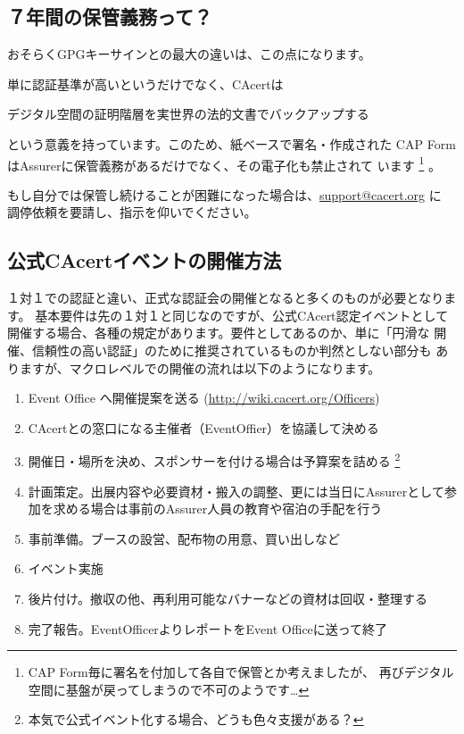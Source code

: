 \documentclass[mingoth,a4paper]{jsarticle}
\begin{document}
\subsection{７年間の保管義務って？}
おそらくGPGキーサインとの最大の違いは、この点になります。

単に認証基準が高いというだけでなく、CAcertは
\begin{center}
\Large{デジタル空間の証明階層を実世界の法的文書でバックアップする}
\end{center}
という意義を持っています。このため、紙ベースで署名・作成された
CAP FormはAssurerに保管義務があるだけでなく、その電子化も禁止されて
います
\footnote{CAP Form毎に署名を付加して各自で保管とか考えましたが、
再びデジタル空間に基盤が戻ってしまうので不可のようです…}
。

もし自分では保管し続けることが困難になった場合は、\url{support@cacert.org} に
調停依頼を要請し、指示を仰いでください。

\subsection{公式CAcertイベントの開催方法}
１対１での認証と違い、正式な認証会の開催となると多くのものが必要となります。
基本要件は先の１対１と同じなのですが、公式CAcert認定イベントとして
開催する場合、各種の規定があります。要件としてあるのか、単に「円滑な
開催、信頼性の高い認証」のために推奨されているものか判然としない部分も
ありますが、マクロレベルでの開催の流れは以下のようになります。

\begin{enumerate}
\item Event Office へ開催提案を送る (\url{http://wiki.cacert.org/Officers})
\item CAcertとの窓口になる主催者（EventOffier）を協議して決める
\item 開催日・場所を決め、スポンサーを付ける場合は予算案を詰める
\footnote{本気で公式イベント化する場合、どうも色々支援がある？}
\item 計画策定。出展内容や必要資材・搬入の調整、更には当日にAssurerとして参加を求める場合は事前のAssurer人員の教育や宿泊の手配を行う
\item 事前準備。ブースの設営、配布物の用意、買い出しなど
\item イベント実施
\item 後片付け。撤収の他、再利用可能なバナーなどの資材は回収・整理する
\item 完了報告。EventOfficerよりレポートをEvent Officeに送って終了
\end{enumerate}
\end{document}
